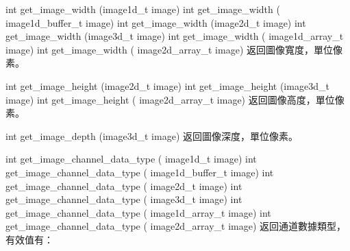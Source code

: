 int get_image_width (image1d_t image)
int get_image_width (
	image1d_buffer_t image)
int get_image_width (image2d_t image)
int get_image_width (image3d_t image)
int get_image_width (
	image1d_array_t image)
int get_image_width (
	image2d_array_t image)
\stopbuffer
{}
返回圖像寬度，單位像素。
\stopbuffer

int get_image_height (image2d_t image)
int get_image_height (image3d_t image)
int get_image_height (
	image2d_array_t image)
\stopbuffer
{}
返回圖像高度，單位像素。
\stopbuffer

int get_image_depth (image3d_t image)
\stopbuffer
{}
返回圖像深度，單位像素。
\stopbuffer

int get_image_channel_data_type (
	image1d_t image)
int get_image_channel_data_type (
	image1d_buffer_t image)
int get_image_channel_data_type (
	image2d_t image)
int get_image_channel_data_type (
	image3d_t image)
int get_image_channel_data_type (
	image1d_array_t image)
int get_image_channel_data_type (
	image2d_array_t image)
\stopbuffer
{}
返回通道數據類型，有效值有：
\startigBase
\item {}
\item {}
\item {}
\item {}
\item {}
\item {}
\item {}
\item {}
\item {}
\item {}
\item {}
\item {}
\item {}
\item {}
\item {}
\stopigBase
\stopbuffer

